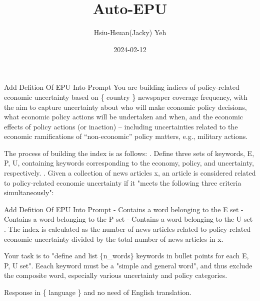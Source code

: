 \documentclass[12pt]{beamer}
\title{\huge{Auto-EPU}}
\author{Hsiu-Hsuan(Jacky) Yeh}
\date{2024-02-12}
\begin{document}
\maketitle


\begin{frame}{Add Defition Of EPU Into Prompt}
You are building indices of policy-related economic uncertainty based on
\{ country \} newspaper coverage frequency, with the aim to capture
uncertainty about who will make economic policy decisions, what economic policy
actions will be undertaken and when, and the economic effects of policy actions
(or inaction) – including uncertainties related to the economic ramifications
of “non-economic” policy matters, e.g., military actions.

The process of building the index is as follows: . Define three sets of keywords, E, P, U, containing keywords
    corresponding to the economy, policy, and uncertainty, respectively. . Given a collection of news articles x, an article is considered related to
    policy-related economic uncertainty if it "meets the following three
    criteria simultaneously":
\end{frame}


\begin{frame}{Add Defition Of EPU Into Prompt}
- Contains a word belonging to the E set \newline
- Contains a word belonging to the P set \newline
- Contains a word belonging to the U set . The index is calculated as the number of news articles related to
    policy-related economic uncertainty divided by the total number of news
    articles in x. \newline

Your task is to "define and list \{n\_words\} keywords in bullet points for each E, P, U set". Eeach
keyword must be a "simple and general word", and thus exclude the composite
word, especially various uncertainty and policy categories.\newline

Response in \{ language \}  and no need of English translation.
\end{frame}
\end{document}
